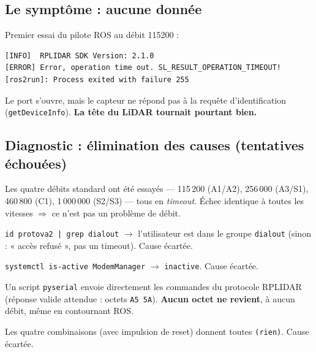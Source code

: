 \documentclass[a4paper,11pt]{article}
\newcommand{\ko}{\textcolor{danger}{\ding{55}}}
\begin{document}
\subsection{Le symptôme : aucune donnée}
Premier essai du pilote ROS au débit 115200 :
\begin{lstlisting}
[INFO]  RPLIDAR SDK Version: 2.1.0
[ERROR] Error, operation time out. SL_RESULT_OPERATION_TIMEOUT!
[ros2run]: Process exited with failure 255
\end{lstlisting}
Le port s'ouvre, mais le capteur ne répond pas à la requête d'identification
(\texttt{getDeviceInfo}). \textbf{La tête du LiDAR tournait pourtant bien.}

\subsection{Diagnostic : élimination des causes (tentatives échouées)}
\begin{description}[leftmargin=0em, itemsep=2pt]
  \item[(\ko) Mauvais débit série.] Les quatre débits standard ont été essayés ---
        115\,200 (A1/A2), 256\,000 (A3/S1), 460\,800 (C1), 1\,000\,000 (S2/S3) ---
        tous en \emph{timeout}. Échec identique à toutes les vitesses
        $\Rightarrow$ ce n'est pas un problème de débit.
  \item[(\ko) Droits d'accès.] \texttt{id protova2 | grep dialout} $\rightarrow$
        l'utilisateur est dans le groupe \texttt{dialout} (sinon : « accès
        refusé », pas un timeout). Cause écartée.
  \item[(\ko) Interférence ModemManager.] \texttt{systemctl is-active
        ModemManager} $\rightarrow$ \texttt{inactive}. Cause écartée.
  \item[(\ko) Sonde série bas niveau.] Un script \texttt{pyserial} envoie
        directement les commandes du protocole RPLIDAR (réponse valide attendue :
        octets \texttt{A5 5A}). \textbf{Aucun octet ne revient}, à aucun débit,
        même en contournant ROS.
  \item[(\ko) Lignes DTR/RTS.] Les quatre combinaisons (avec impulsion de reset)
        donnent toutes \texttt{(rien)}. Cause écartée.
\end{description}
\end{document}
